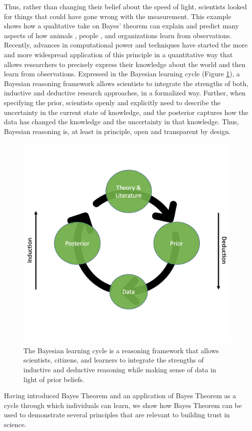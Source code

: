 \documentclass[man]{apa7}
\begin{document}
Thus, rather than changing their belief about the speed of light, scientists looked for things that could have gone wrong with the measurement. This example shows how a qualitative take on Bayes’ theorem can explain and predict many aspects of how animals \parencite{o13}, people \parencite{tgk06}, and organizations \parencite{kaj12} learn from observations. Recently, advances in computational power and techniques have started the more and more widespread application of this principle in a quantitative way that allows researchers to precisely express their knowledge about the world and then learn from observations. 
Expressed in the Bayesian learning cycle (Figure \ref{fig:The Bayesian Learning Cycle}), a Bayesian reasoning framework allows scientists to integrate the strengths of both, inductive and deductive research approaches, in a formalized way. Further, when specifying the prior, scientists openly and explicitly need to describe the uncertainty in the current state of knowledge, and the posterior captures how the data has changed the knowledge and the uncertainty in that knowledge. Thus, Bayesian reasoning is, at least in principle, open and transparent by design.
\begin{figure}[h]
\begin{center}
\includegraphics[width = .65\paperwidth]{learning.png}
\caption{The Bayesian learning cycle is a reasoning framework that allows scientists, citizens, and learners to integrate the strengths of inductive and deductive reasoning while making sense of data in light of prior beliefs.}
\label{fig:The Bayesian Learning Cycle}
\end{center}
\end{figure}
Having introduced Bayes Theorem and an application of Bayes Theorem as a cycle through which individuals can learn, we show how Bayes Theorem can be used to demonstrate several principles that are relevant to building trust in science.
\end{document}
